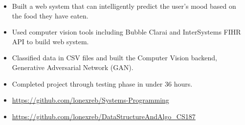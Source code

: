 \documentclass[10pt,a4paper]{altacv}
\begin{document}


\begin{itemize}
\item	Built a web system that can intelligently predict the user’s mood based on the food they have eaten. 
\item Used computer vision tools including Bubble Clarai and InterSystems FIHR API to build web system. 
\item Classified data in CSV files and built the Computer Vision backend, Generative Adversarial Network (GAN).
\item Completed project through testing phase in under 36 hours.

\end{itemize}
\divider




\begin{itemize}
\item \url{https://github.com/lonexreb/Systems-Programming}
\item \url{https://github.com/lonexreb/DataStructureAndAlgo_CS187}
\end{itemize}
\divider

\clearpage
\end{document}
